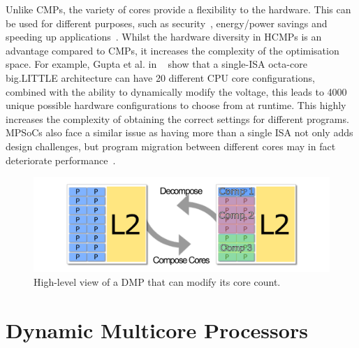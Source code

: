 Unlike CMPs, the variety of cores provide a flexibility to the hardware.
This can be used for different purposes, such as security~\cite{venkatHipstr2016}, energy/power savings and speeding up applications~\cite{venkat2014harnessingisa}.
Whilst the hardware diversity in HCMPs is an advantage compared to CMPs, it increases the complexity of the optimisation space.
For example, Gupta et al. in ~\cite{Gupta2017Dypo} show that a single-ISA octa-core big.LITTLE architecture can have 20 different CPU core configurations, combined with the ability to dynamically modify the voltage, this leads to 4000 unique possible hardware configurations to choose from at runtime.
This highly increases the complexity of obtaining the correct settings for different programs.
MPSoCs also face a similar issue as having more than a single ISA not only adds design challenges, but program migration between different cores may in fact deteriorate performance~\cite{DeVuystMigration2012}.

\begin{figure}[t]
    \centering
    \includegraphics[width=1\textwidth]{background/graphics/cmp_new.pdf}
	\vspace{-3em}
    \caption{High-level view of a DMP that can modify its core count.}
    \label{fig:dynmulticore}
	\vspace{-0.5em}
\end{figure}

\vspace{-1em}
\section{Dynamic Multicore Processors}~\label{sec:dmp}
\vspace{-1em}

